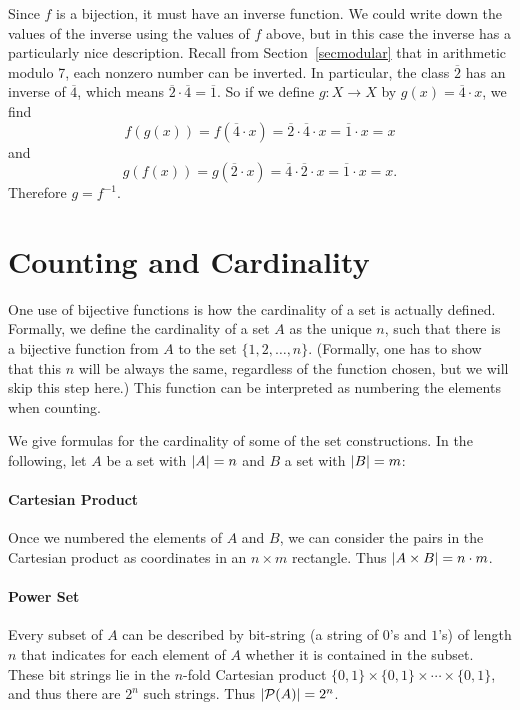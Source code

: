 Since $f$ is a bijection, it must have an inverse function.
We could write down the values of the inverse using the values of $f$ above, but in this case the inverse has a particularly nice description.
Recall from Section~\ref{secmodular}
that in arithmetic modulo 7, each nonzero number can be inverted.
In particular, the class $\overline{2}$ has an inverse of $\overline{4}$, which means $\overline{2} \cdot \overline{4} = \overline{1}$.
So if we define $g \colon X \to X$ by $g(x) = \overline{4} \cdot x$, we find
\[
f(g(x)) = f(\overline{4} \cdot x) = \overline{2} \cdot \overline{4} \cdot x = \overline{1} \cdot x = x
\]
and
\[
g(f(x)) = g(\overline{2} \cdot x) = \overline{4} \cdot \overline{2} \cdot x = \overline{1} \cdot x = x.
\]
Therefore $g = f^{-1}$.

\section{Counting and Cardinality}
\label{defcardinality}

One use of bijective functions is how the cardinality of a set is actually defined.
Formally, we
define the cardinality of a set $A$ as the unique $n$, such that there is a bijective
function from $A$ to the set $\{1,2,\ldots,n\}$. (Formally, one has to show that this
$n$ will be always the same, regardless of the function chosen, but we will skip this
step here.) This function can be interpreted as numbering the elements when counting.

We give formulas for the cardinality of some of the set constructions. In the following,
let $A$ be a set with $\left|A\right|=n$ and $B$ a set with $\left|B\right|=m$:

\paragraph{Cartesian Product}
Once we numbered the elements of $A$ and $B$, we can consider the pairs in the Cartesian
product as coordinates in an $n\times m$ rectangle. Thus $\left|A\times B\right|=n\cdot m$.

\paragraph{Power Set}
Every subset of $A$ can be described by bit-string (a string of $0$'s and
$1$'s) of length $n$ that indicates for each
element of $A$ whether it is contained in the subset. These bit strings lie in the
$n$-fold Cartesian product $\{0,1\}\times\{0,1\}\times\cdots\times\{0,1\}$, and thus
there are $2^n$ such strings. Thus $\left|{\mathcal P}(A)\right|=2^n$.

